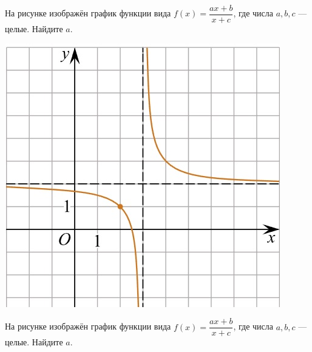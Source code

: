 \begin{class}[number=5]
\begin{listofex}
\begin{minipage}[c]{0.25\textwidth}
		\end{minipage}
		\item
		\begin{minipage}[t]{0.67\textwidth}
			На рисунке изображён график функции вида \(f(x)=\dfrac{ax+b}{x+c}\), где числа \(a, b, c\) --- целые. Найдите \(a\).
		\end{minipage}
		\begin{minipage}[c]{0.25\textwidth}
			\includegraphics[align=t, width=\textwidth]{pics/G101M4C5-4.jpg}
		\end{minipage}
		\item
		\begin{minipage}[t]{0.67\textwidth}
			На рисунке изображён график функции вида \(f(x)=\dfrac{ax+b}{x+c}\), где числа \(a, b, c\) --- целые. Найдите \(a\).
		\end{minipage}
		\begin{minipage}[c]{0.25\textwidth}

\end{minipage}
\end{listofex}
\end{class}
